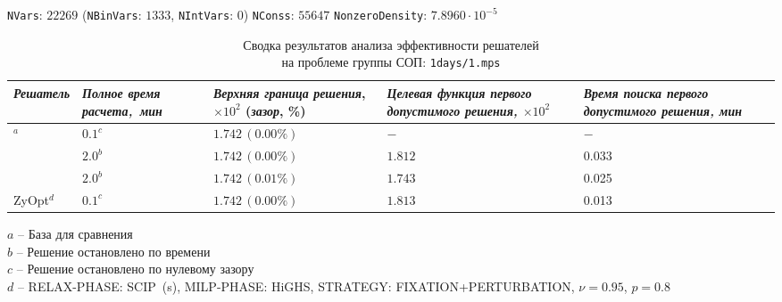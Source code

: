 \documentclass[%
	11pt,
	a4paper,
	utf8,
		]{article}
\begin{document}
{
	\begin{table}[!h]
		\centering
		\caption{Сводка результатов анализа эффективности решателей\\ на проблеме группы СОП: \texttt{1days/1.mps}} 
		
		{\footnotesize \texttt{NVars}: $ 22 269 $ (\texttt{NBinVars}: $ 1333 $,  \texttt{NIntVars}: $ 0 $) \texttt{NConss}: $ 55 647 $ \texttt{NonzeroDensity}: $ 7.8960 \cdot 10^{-5} $}\\[2mm]
		
		\begin{tabular}{ p{2.9cm} | p{2.5cm} p{3.4cm} p{3.75cm} p{3.6cm} p{3.2cm} }
			\rowcolor{black!5}\emph{Решатель} & \emph{Полное время \mbox{расчета, мин}} & \emph{Верхняя граница} \mbox{\itshape решения}, $ \times 10^{2} $ (\emph{зазор}, \%) & \emph{Целевая функция первого допустимого решения, $ \times 10^2 $} & \emph{Время поиска первого допустимого решения, мин} \\
			\hline
			\rowcolor{blue!3}{CPLEX 12.8.0.0}$ ^a $ & $ 0.1^c $ & $ 1.742 \, (0.00\%) $ & $ - $ & $ - $ \\
			\rowcolor{black!5}{SCIP 8.0.3} & $ 2.0^b $ & $ 1.742 \, (0.00\%) $ & $ 1.812 $ & 0.033 \\
			\rowcolor{blue!3}{HiGHS 1.5.3} & $ 2.0^b $ & $ 1.742 \, (0.01\%) $ & $ 1.743 $ & 0.025 \\
			\rowcolor{black!5}ZyOpt$^d$ & {$ 0.1^c $}  & $ {1.742} \, (0.00\%) $ & $ 1.813 $ & 0.013 \\
		\end{tabular}
	\end{table}
	\vspace*{-3mm}
	\hspace*{3mm}$ a $ -- {\footnotesize База для сравнения}\\[-7mm]
	
	\hspace*{3mm}$ b $ -- {\footnotesize Решение остановлено по времени}\\[-7mm]
	
	\hspace*{3mm}$ c $ -- {\footnotesize Решение остановлено по нулевому зазору}\\[-7mm]
	
	\hspace*{3mm}$ d $ -- {\footnotesize RELAX-PHASE: SCIP~(s), MILP-PHASE: HiGHS, STRATEGY: FIXATION+PERTURBATION, $ \nu = 0.95 $, $ p = 0.8 $}\\[-7mm]
}
\end{document}
